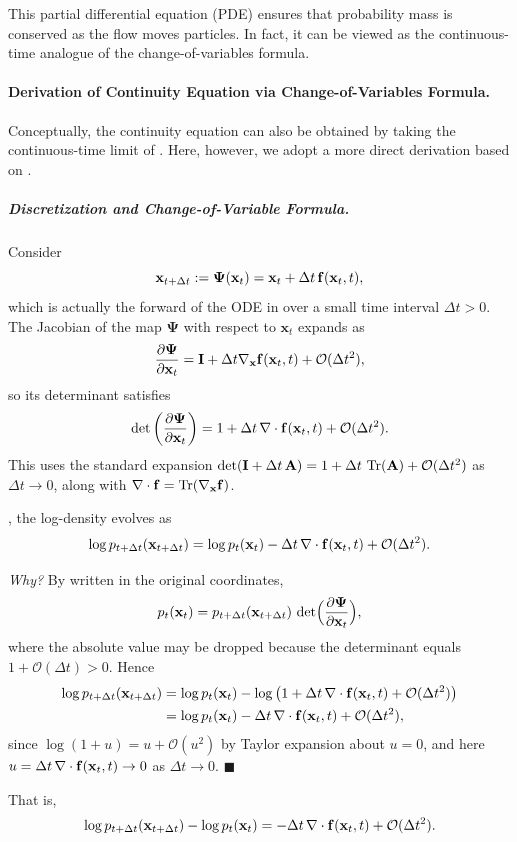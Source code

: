 This partial differential equation (PDE) ensures that probability mass is conserved as the flow moves particles.  
In fact, it can be viewed as the continuous-time analogue of the change-of-variables formula.


\paragraph{Derivation of Continuity Equation via  Change-of-Variables Formula.} Conceptually, the continuity equation can also be obtained by taking the continuous-time limit of . Here, however, we adopt a more direct derivation based on .
\subparagraph{Discretization and Change-of-Variable Formula.}
Consider 
\[
\mathbf{x}_{t+\Delta t} := \bm{\Psi}(\mathbf{x}_t) = \mathbf{x}_t + \Delta t\, {\mathbf{f}}(\mathbf{x}_t, t),
\]
which is actually the forward  of the ODE in  over a small time interval $\Delta t > 0$.
The Jacobian of the map $\bm{\Psi}$ with respect to $\mathbf{x}_t$ expands as
\[
\frac{\partial \bm{\Psi}}{\partial \mathbf{x}_t} = {\mathbf{I}} + \Delta t \nabla_{\mathbf{x}} {\mathbf{f}}(\mathbf{x}_t, t) + \mathcal{O}(\Delta t^2),
\]
so its determinant satisfies
\[
\det\left( \frac{\partial \bm{\Psi}}{\partial \mathbf{x}_t} \right) = 1 + \Delta t\, \nabla \cdot {\mathbf{f}}(\mathbf{x}_t, t) + \mathcal{O}(\Delta t^2).
\]
This uses the standard expansion $\det({\mathbf{I}} + \Delta t\, \mathbf{A}) = 1 + \Delta t\, \operatorname{Tr}(\mathbf{A}) + \mathcal{O}(\Delta t^2)$ as $\Delta t \to 0$, along with $\nabla \cdot {\mathbf{f}} = \operatorname{Tr}(\nabla_{\mathbf{x}} {\mathbf{f}})$.

, the log-density evolves as
\begin{align*}
\log p_{t+\Delta t}(\mathbf{x}_{t+\Delta t}) = \log p_t(\mathbf{x}_t) - \Delta t\, \nabla \cdot {\mathbf{f}}(\mathbf{x}_t, t) + \mathcal{O}(\Delta t^2).
\end{align*}
\begin{nknote}
\noindent\textit{Why?} By  written in the original coordinates,
\[
p_t({\mathbf{x}}_t) = p_{t+\Delta t}({\mathbf{x}}_{t+\Delta t})\,\det\!\Big(\frac{\partial \bm{\Psi}}{\partial {\mathbf{x}}_t}\Big),
\]
where the absolute value may be dropped because the determinant equals $1 + \mathcal{O}(\Delta t) > 0$. Hence
\begin{align*}
\log p_{t+\Delta t}({\mathbf{x}}_{t+\Delta t})
&= \log p_t({\mathbf{x}}_t) - \log\big(1 + \Delta t\,\nabla\cdot{\mathbf{f}}({\mathbf{x}}_t,t) + \mathcal{O}(\Delta t^2)\big) \\
&= \log p_t({\mathbf{x}}_t) - \Delta t\,\nabla\cdot{\mathbf{f}}({\mathbf{x}}_t,t) + \mathcal{O}(\Delta t^2),
\end{align*}
since $\log(1+u) = u + \mathcal{O}(u^2)$ by Taylor expansion about $u=0$, and here $u = \Delta t\,\nabla\cdot{\mathbf{f}}({\mathbf{x}}_t,t) \to 0$ as $\Delta t \to 0$. \hfill$\blacksquare$
\end{nknote}
That is,
\begin{align}
    \label{eq:log-density-diff}
\log p_{t+\Delta t}(\mathbf{x}_{t+\Delta t}) - \log p_t(\mathbf{x}_t) = - \Delta t\, \nabla \cdot {\mathbf{f}}(\mathbf{x}_t, t) + \mathcal{O}(\Delta t^2).
\end{align}

